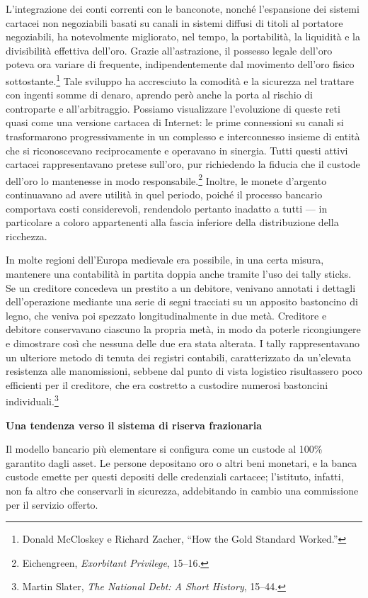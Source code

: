 \documentclass[
  a5paper,
  smalldemyvopaper,10pt,twoside,onecolumn,openright,extrafontsizes,hidelinks]{memoir}
\begin{document}
L'integrazione dei conti correnti con le banconote, nonché l'espansione
dei sistemi cartacei non negoziabili basati su canali in sistemi diffusi
di titoli al portatore negoziabili, ha notevolmente migliorato, nel
tempo, la portabilità, la liquidità e la divisibilità effettiva
dell'oro. Grazie all'astrazione, il possesso legale dell'oro poteva ora
variare di frequente, indipendentemente dal movimento dell'oro fisico
sottostante.\footnote{Donald McCloskey e Richard Zacher, ``How the Gold
  Standard Worked.''} Tale sviluppo ha accresciuto la comodità e la
sicurezza nel trattare con ingenti somme di denaro, aprendo però anche
la porta al rischio di controparte e all'arbitraggio. Possiamo
visualizzare l'evoluzione di queste reti quasi come una versione
cartacea di Internet: le prime connessioni su canali si trasformarono
progressivamente in un complesso e interconnesso insieme di entità che
si riconoscevano reciprocamente e operavano in sinergia. Tutti questi
attivi cartacei rappresentavano pretese sull'oro, pur richiedendo la
fiducia che il custode dell'oro lo mantenesse in modo
responsabile.\footnote{Eichengreen, \emph{Exorbitant Privilege}, 15--16.}
Inoltre, le monete d'argento continuavano ad avere utilità in quel
periodo, poiché il processo bancario comportava costi considerevoli,
rendendolo pertanto inadatto a tutti --- in particolare a coloro
appartenenti alla fascia inferiore della distribuzione della ricchezza.

In molte regioni dell'Europa medievale era possibile, in una certa
misura, mantenere una contabilità in partita doppia anche tramite l'uso
dei tally sticks. Se un creditore concedeva un prestito a un debitore,
venivano annotati i dettagli dell'operazione mediante una serie di segni
tracciati su un apposito bastoncino di legno, che veniva poi spezzato
longitudinalmente in due metà. Creditore e debitore conservavano
ciascuno la propria metà, in modo da poterle ricongiungere e dimostrare
così che nessuna delle due era stata alterata. I tally rappresentavano
un ulteriore metodo di tenuta dei registri contabili, caratterizzato da
un'elevata resistenza alle manomissioni, sebbene dal punto di vista
logistico risultassero poco efficienti per il creditore, che era
costretto a custodire numerosi bastoncini individuali.\footnote{Martin
  Slater, \emph{The National Debt: A Short History}, 15--44.}

\textbf{Una tendenza verso il sistema di riserva frazionaria}

Il modello bancario più elementare si configura come un custode al 100\%
garantito dagli asset. Le persone depositano oro o altri beni monetari,
e la banca custode emette per questi depositi delle credenziali
cartacee; l'istituto, infatti, non fa altro che conservarli in
sicurezza, addebitando in cambio una commissione per il servizio
offerto.
\end{document}
